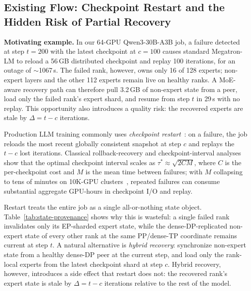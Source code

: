 \documentclass[10pt,conference]{IEEEtran}
\begin{document}
\subsection{Existing Flow: Checkpoint Restart and the Hidden Risk of Partial Recovery}
\label{sec:bg-flow}

\textbf{Motivating example.} In our 64-GPU Qwen3-30B-A3B job, a failure detected at step $t\!=\!200$ with the latest checkpoint at $c\!=\!100$ causes standard Megatron-LM to reload a 56\,GB distributed checkpoint and replay 100 iterations, for an outage of $\sim$1067\,s. The failed rank, however, owns only 16 of 128 experts; non-expert layers and the other 112 experts remain live on healthy ranks. A MoE-aware recovery path can therefore pull 3.2\,GB of non-expert state from a peer, load only the failed rank's expert shard, and resume from step $t$ in 29\,s with no replay. This opportunity also introduces a quality risk: the recovered experts are stale by $\Delta=t-c$ iterations.

Production LLM training commonly uses \emph{checkpoint restart}~\cite{narayanan2021megatron,dubey2024llama3,jiang2024megascale}: on a failure, the job reloads the most recent globally consistent snapshot at step $c$ and replays the $t-c$ lost iterations. Classical rollback-recovery and checkpoint-interval analyses~\cite{elnozahy2002survey,young1974first,daly2006higher} show that the optimal checkpoint interval scales as $\tau^{*}\!\approx\!\sqrt{2CM}$, where $C$ is the per-checkpoint cost and $M$ is the mean time between failures; with $M$ collapsing to tens of minutes on 10K-GPU clusters~\cite{dubey2024llama3,jiang2024megascale}, repeated failures can consume substantial aggregate GPU-hours in checkpoint I/O and replay.

Restart treats the entire job as a single all-or-nothing state object. Table~\ref{tab:state-provenance} shows why this is wasteful: a single failed rank invalidates only its EP-sharded expert state, while the dense-DP-replicated non-expert state of every other rank at the same PP/dense-TP coordinate remains current at step $t$. A natural alternative is \emph{hybrid recovery}: synchronize non-expert state from a healthy dense-DP peer at the current step, and load only the rank-local experts from the latest checkpoint shard at step $c$. Hybrid recovery, however, introduces a side effect that restart does not: the recovered rank's expert state is stale by $\Delta = t-c$ iterations relative to the rest of the model.
\end{document}
